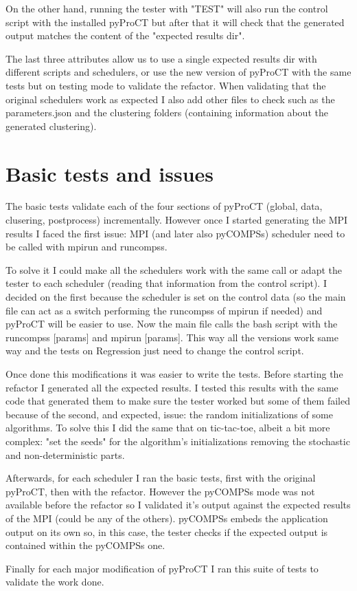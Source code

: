 On the other hand, running the tester with "TEST" will also run the control script with the installed pyProCT but after that it will check that the generated output matches the content of the "expected results dir".

The last three attributes allow us to use a single expected results dir with different scripts and schedulers, or use the new version of pyProCT with the same tests but on testing mode to validate the refactor. When validating that the original schedulers work as expected I also add other files to check such as the parameters.json and the clustering folders (containing information about the generated clustering).

\section{Basic tests and issues}

The basic tests validate each of the four sections of pyProCT (global, data, clusering, postprocess) incrementally. However once I started generating the MPI results I faced the first issue: MPI (and later also pyCOMPSs) scheduler need to be called with mpirun and runcompss. 

To solve it I could make all the schedulers work with the same call or adapt the tester to each scheduler (reading that information from the control script). I decided on the first because the scheduler is set on the control data (so the main file can act as a switch performing the runcompss of mpirun if needed) and pyProCT will be easier to use. Now the main file calls the bash script with the runcompss [params] and mpirun [params]. This way all the versions work same way and the tests on Regression just need to change the control script.

Once done this modifications it was easier to write the tests. Before starting the refactor I generated all the expected results. I tested this results with the same code that generated them to make sure the tester worked but some of them failed because of the second, and expected, issue: the random initializations of some algorithms. To solve this I did the same that on tic-tac-toe, albeit a bit more complex: "set the seeds" for the algorithm's initializations removing the stochastic and non-deterministic parts.


Afterwards, for each scheduler I ran the basic tests, first with the original pyProCT, then with the refactor. However the pyCOMPSs mode was not available before the refactor so I validated it's output against the expected results of the MPI (could be any of the others). pyCOMPSs embeds the application output on its own so, in this case, the tester checks if the expected output is contained within the pyCOMPSs one.

Finally for each major modification of pyProCT I ran this suite of tests to validate the work done.
